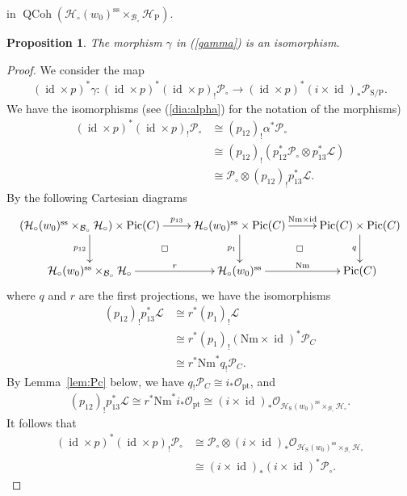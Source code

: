 \documentclass[11pt,oneside,a4paper,mathscr]{amsart}
\makeatletter
\newtheorem{prop}[thm]{Proposition}
\theoremstyle{definition}
\newcommand{\Pic}{\operatorname{Pic}}
\newcommand{\QCoh}{\operatorname{QCoh}}
\newcommand{\cH}{\mathcal{H}}
\newcommand{\cB}{\mathcal{B}}
\newcommand{\cP}{\mathcal{P}}
\newcommand{\diasquare}{\ar@{}[rd]|\square}
\newcommand{\id}{\operatorname{id}}
\newcommand{\rS}{\mathrm{S}}
\newcommand{\rP}{\mathrm{P}}
\makeatother
\begin{document}
in $\QCoh(\cH_{\circ}(w_0)^{\mathrm{ss}}\times_{\cB_{\circ}}\cH_{\mathrm{P}})$. 
\begin{prop}\label{prop:gisom}
The morphism $\gamma$ in (\ref{gamma}) is an isomorphism. 
\end{prop}
\begin{proof}
  We consider the map 
\begin{align}\label{idp*}
(\id \times p)^* \gamma \colon 
(\id \times p)^* (\id \times p)_{!} \cP_{\circ}
\to 
(\id \times p)^* (i\times \id)_{*}\cP_{\rS/\rP}.
\end{align}
We have the isomorphisms (see (\ref{dia:alpha}) for the notation of the morphisms)
\begin{align*}
(\id \times p)^* (\id\times p)_{!}\cP_{\circ}
&\cong (p_{12})_{!}\alpha^* \cP_{\circ} \\
&\cong (p_{12})_{!}(p_{12}^* \cP_{\circ}\otimes p_{13}^* \mathcal{L}) \\
&\cong \cP_{\circ}\otimes (p_{12})_{!}p_{13}^* \mathcal{L}.
\end{align*}
By the following Cartesian diagrams
\begin{align*}
\xymatrix{
(\cH_{\circ}(w_0)^{\mathrm{ss}}\times_{\cB_{\circ}}\cH_{\circ})\times \Pic(C)
\ar[r]^-{p_{13}} \ar[d]_-{p_{12}} \diasquare
&
\cH_{\circ}(w_0)^{\mathrm{ss}}\times \Pic(C)
\ar[r]^-{\mathrm{Nm}\times \id} \ar[d]_-{p_1} \diasquare
&
\Pic(C) \times \Pic(C) \ar[d]_-{q}
\\
\cH_{\circ}(w_0)^{\mathrm{ss}}\times_{\cB_{\circ}}\cH_{\circ}
\ar[r]^-{r}
&
\cH_{\circ}(w_0)^{\mathrm{ss}}
\ar[r]^-{\mathrm{Nm}}
&
\Pic(C)
}
\end{align*}
where $q$ and $r$ are the first projections, 
we have the isomorphisms
\begin{align*}
(p_{12})_{!}p_{13}^* \mathcal{L}
&\cong r^* (p_1)_{!}\mathcal{L} \\
&\cong r^* (p_1)_{!}(\mathrm{Nm}\times \id)^* \cP_C \\
&\cong r^* \mathrm{Nm}^* q_{!}\cP_C.
\end{align*}
By Lemma~\ref{lem:Pc} below, we have $q_{!}\cP_C \cong i_{*}\mathcal{O}_{\mathrm{pt}}$, and 
\begin{align*}
    (p_{12})_{!}p_{13}^* \mathcal{L} \cong r^* \mathrm{Nm}^* i_{*}\mathcal{O}_{\mathrm{pt}} 
    \cong (i\times \id)_{*}\mathcal{O}_{\cH_{\rS}(w_0)^{\mathrm{ss}}\times_{\cB_{\circ}}\cH_{\circ}}.
\end{align*}
It follows that 
\begin{align*}
    (\id \times p)^* (\id \times p)_{!}\cP_{\circ} &\cong \cP_{\circ}\otimes 
    (i\times \id)_{*}\mathcal{O}_{\cH_{\rS}(w_0)^{\mathrm{ss}}\times_{\cB_{\circ}}\cH_{\circ}} 
    \\
    &\cong (i\times \id)_{*}(i\times \id)^* \cP_{\circ}.
\end{align*}


\end{proof}
\end{document}
